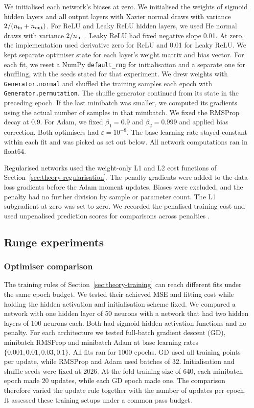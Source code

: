 We initialised each network's biases at zero. We initialised the weights
of sigmoid hidden layers and all output layers with Xavier normal draws with variance $2/(n_{\rm in}+n_{\rm out})$.
For ReLU and Leaky ReLU hidden layers, we used He normal draws with variance
$2/n_{\rm in}$ \parencite{hjorthjensenLectureNotes}. Leaky ReLU had fixed
negative slope 0.01. At zero, the implementation used derivative zero
for ReLU and 0.01 for Leaky ReLU. We kept separate optimiser state for each layer's weight matrix and
bias vector. For each fit, we reset a NumPy \nolinkurl{default_rng}
for initialisation and a separate one for shuffling, with the seeds
stated for that experiment. We drew weights with \nolinkurl{Generator.normal}
and shuffled the training samples each epoch with \nolinkurl{Generator.permutation}.
The shuffle generator continued from its state in the preceding epoch. If the last minibatch was smaller, we computed its gradients using the
actual number of samples in that minibatch. We fixed the RMSProp decay at 0.9.
For Adam, we fixed $\beta_1=0.9$ and $\beta_2=0.999$ and applied bias
correction. Both optimisers had $\varepsilon=10^{-8}$. The base learning rate stayed constant within each fit and was picked as set out below.
All network computations ran in float64.

Regularised networks used the weight-only L1 and L2 cost functions of
Section~\ref{sec:theory-regularisation}. The penalty gradients were added
to the data-loss gradients before the Adam moment updates. Biases were
excluded, and the penalty had no further division by sample or parameter
count. The L1 subgradient at zero was set to zero. We recorded the
penalised training cost and used unpenalised prediction scores for
comparisons across penalties \parencite{goodfellow2016deep}.

\subsection{Runge experiments}
\subsubsection{Optimiser comparison}
The training rules of Section~\ref{sec:theory-training} can reach different
fits under the same epoch budget. We tested their achieved MSE and
fitting cost while holding the hidden activation and initialisation
scheme fixed. We compared a network with one hidden layer of 50 neurons with a network
that had two hidden layers of 100 neurons each. Both had sigmoid hidden
activation functions and no penalty. For each architecture we tested full-batch gradient descent (GD), minibatch RMSProp and minibatch Adam at base learning rates
$\{0.001,0.01,0.03,0.1\}$. All fits ran for 1000 epochs. GD used all
training points per update, while RMSProp and Adam used batches of 32.
Initialisation and shuffle seeds were fixed at 2026. At the fold-training size of 640, each minibatch epoch made 20 updates,
while each GD epoch made one. The comparison therefore varied the
update rule together with the number of updates per epoch. It assessed
these training setups under a common pass budget.

